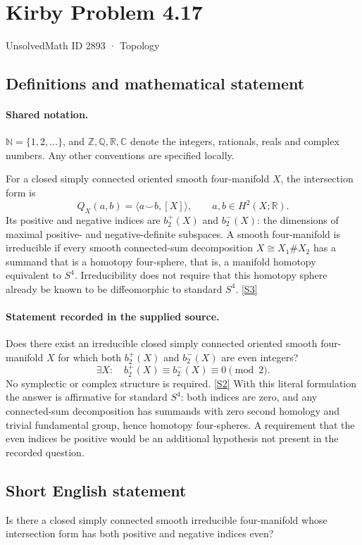 \documentclass[11pt]{article}
\newcommand{\sref}[2]{\hyperlink{source:#1:#2}{[S#2]}}
\begin{document}
\setcounter{section}{2892}
\section{Kirby Problem 4.17}\label{2893}
{\small\sffamily UnsolvedMath ID 2893 · Topology}
\subsection{Definitions and mathematical statement}

\paragraph{Shared notation.}$\mathbb N=\{1,2,\ldots\}$, and $\mathbb Z,\mathbb Q,\mathbb R,\mathbb C$ denote the integers, rationals, reals and complex numbers. Any other conventions are specified locally.


For a closed simply connected oriented smooth four-manifold $X$, the intersection form is
\[
Q_X(a,b)=\langle a\smile b,[X]\rangle,\qquad a,b\in H^2(X;\mathbb R).
\]
Its positive and negative indices are $b_2^+(X)$ and $b_2^-(X)$: the dimensions of maximal positive- and negative-definite subspaces. A smooth four-manifold is irreducible if every smooth connected-sum decomposition $X\cong X_1\#X_2$ has a summand that is a homotopy four-sphere, that is, a manifold homotopy equivalent to $S^4$. Irreducibility does not require that this homotopy sphere already be known to be diffeomorphic to standard $S^4$. \sref{2893}{3}
\paragraph{Statement recorded in the supplied source.}
Does there exist an irreducible closed simply connected oriented smooth four-manifold $X$ for which both $b_2^+(X)$ and $b_2^-(X)$ are even integers?
\[
\exists X:\quad b_2^+(X)\equiv b_2^-(X)\equiv0\pmod2.
\]
No symplectic or complex structure is required. \sref{2893}{2}
With this literal formulation the answer is affirmative for standard $S^4$: both indices are zero, and any connected-sum decomposition has summands with zero second homology and trivial fundamental group, hence homotopy four-spheres. A requirement that the even indices be positive would be an additional hypothesis not present in the recorded question.
\subsection{Short English statement}
Is there a closed simply connected smooth irreducible four-manifold whose intersection form has both positive and negative indices even?
\end{document}
